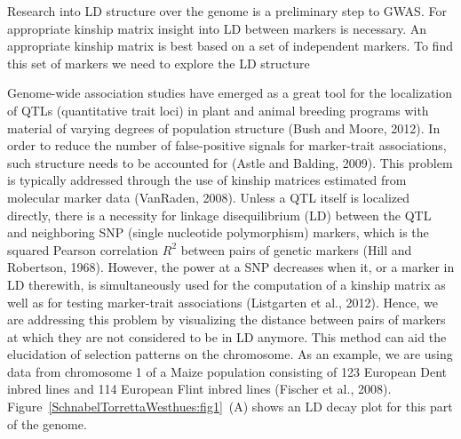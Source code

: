 \documentclass[twoside]{report}
\begin{document}
Research into LD structure over the genome is a preliminary step to GWAS. For appropriate kinship 
matrix insight into LD between markers is necessary. An appropriate kinship matrix is best based
on a set of independent markers. To find this set of markers we need to explore the LD structure 


Genome-wide association studies have emerged as a great tool for the 
localization of QTLs (quantitative trait loci) in plant and animal breeding programs 
with material of varying degrees of population structure (Bush and Moore, 2012). 
In order to reduce the number of false-positive signals for marker-trait associations,
such structure needs to be accounted for (Astle and Balding, 2009). This problem is 
typically addressed through 
the use of kinship matrices estimated from molecular marker data (VanRaden, 2008).
Unless a QTL itself is localized directly, there is a necessity for linkage disequilibrium (LD) between
the QTL and neighboring SNP (single nucleotide polymorphism) markers, 
which is the squared Pearson correlation $R^2$ between pairs of genetic
markers (Hill and Robertson, 1968). However, the power at a SNP 
 decreases when it, or a marker in LD therewith,
is simultaneously used for the computation of a kinship matrix as well as for testing marker-trait 
associations (Listgarten et al., 2012). 
Hence, we are addressing this problem by visualizing the distance
between pairs of markers at which they are not considered to be in LD anymore. 
This method can aid 
the elucidation
of selection patterns on the chromosome. As an example, we are using data from chromosome 1 of a Maize 
population consisting of 123 European Dent inbred lines and 114 European Flint inbred lines
(Fischer et al., 2008). Figure~\ref{SchnabelTorrettaWesthues:fig1}~(A) shows an LD decay plot 
for this part of the genome. 
\end{document}
